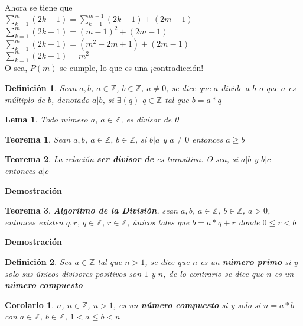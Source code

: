 \documentclass[a4paper,1pt]{report}
\newtheorem*{teo}{Teorema}
\newtheorem*{cor}{Corolario}
\newtheorem*{dfn}{Definición}
\newtheorem*{lem}{Lema}
\begin{document}
Ahora se tiene que\\ 
$\sum^m_{k=1}(2k-1)=\sum^{m-1}_{k=1}(2k-1)+(2m-1)$\\
$\sum^m_{k=1}(2k-1)=(m-1)^2+(2m-1)$\\
$\sum^m_{k=1}(2k-1)=(m^2-2m+1)+(2m-1)$\\
$\sum^m_{k=1}(2k-1)=m^2$\\
O sea, $P(m)$ se cumple, lo que es una ¡contradicción!

\begin{dfn}
 Sean $a,b$, $a\in\mathbb{Z}$, $b\in\mathbb{Z}$, $a\neq 0$, se dice que $a$ divide a $b$ o que $a$ es múltiplo de $b$, denotado $a|b$, si $\exists(q)$ $q\in\mathbb{Z}$ tal que $b=a*q$
\end{dfn}

\begin{lem}
 Todo número $a$, $a\in\mathbb{Z}$, es divisor de 0
\end{lem}

\begin{teo}
 Sean $a,b$, $a\in\mathbb{Z}$, $b\in\mathbb{Z}$, si $b|a$ y $a\neq 0$ entonces $a\geq b$
\end{teo}



\begin{teo}
 La relación \textbf{ser divisor de} es transitiva. O sea, si $a|b$ y $b|c$ entonces $a|c$
\end{teo}

\textbf{Demostración}

\begin{teo}
 \textbf{Algoritmo de la División}, sean $a,b$, $a\in\mathbb{Z}$, $b\in\mathbb{Z}$, $a> 0$, entonces existen $q,r$, $q\in\mathbb{Z}$, $r\in\mathbb{Z}$, únicos tales que $b=a*q+r$ donde $0\leq r < b$
\end{teo}

\textbf{Demostración}

\begin{dfn}
 Sea $a\in\mathbb{Z}$ tal que $n>1$, se dice que $n$ es un \textbf{número primo} si y solo sus únicos divisores positivos son $1$ y $n$, de lo contrario se dice que $n$ es un \textbf{número compuesto}
\end{dfn}

\begin{cor}
 $n$, $n\in\mathbb{Z}$, $n>1$, es un \textbf{número compuesto} si y solo si $n=a*b$ con $a\in\mathbb{Z}$, $b\in\mathbb{Z}$, $1<a\leq b < n$
\end{cor}
\end{document}
